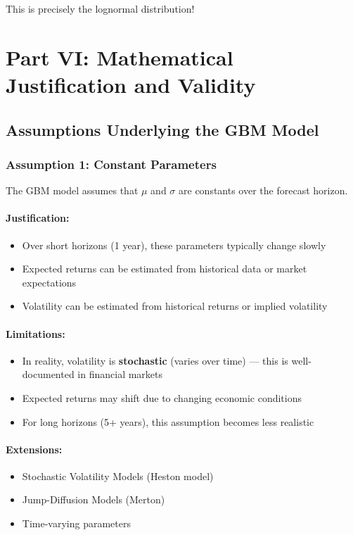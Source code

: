 \documentclass[12pt,a4paper]{article}
\begin{document}
This is precisely the lognormal distribution!

\newpage

\section{Part VI: Mathematical Justification and Validity}

\subsection{Assumptions Underlying the GBM Model}

\subsubsection{Assumption 1: Constant Parameters}

The GBM model assumes that $\mu$ and $\sigma$ are constants over the forecast horizon.

\paragraph{Justification:}
\begin{itemize}
    \item Over short horizons (1 year), these parameters typically change slowly
    \item Expected returns can be estimated from historical data or market expectations
    \item Volatility can be estimated from historical returns or implied volatility
\end{itemize}

\paragraph{Limitations:}
\begin{itemize}
    \item In reality, volatility is \textbf{stochastic} (varies over time) — this is well-documented in financial markets
    \item Expected returns may shift due to changing economic conditions
    \item For long horizons (5+ years), this assumption becomes less realistic
\end{itemize}

\paragraph{Extensions:}
\begin{itemize}
    \item Stochastic Volatility Models (Heston model)
    \item Jump-Diffusion Models (Merton)
    \item Time-varying parameters
\end{itemize}
\end{document}

